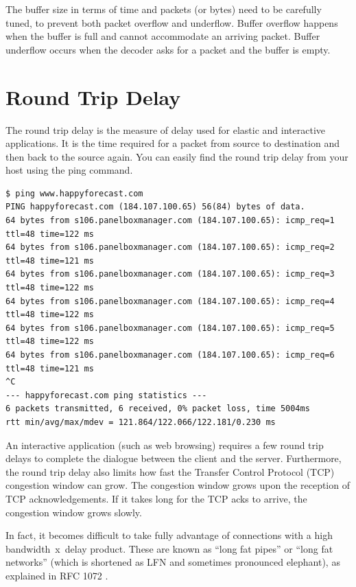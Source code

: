 The buffer size in terms of time and packets (or bytes) need to be carefully tuned, to prevent both packet overflow and underflow.
Buffer overflow happens when the buffer is full and cannot accommodate an arriving packet.
Buffer underflow occurs when the decoder asks for a packet and the buffer is empty.

\section{Round Trip Delay}

The round trip delay is the measure of delay used for elastic and interactive applications.
It is the time required for a packet from source to destination and then back to the source again.
You can easily find the round trip delay from your host using the ping command.

\begin{lstlisting}
$ ping www.happyforecast.com
PING happyforecast.com (184.107.100.65) 56(84) bytes of data.
64 bytes from s106.panelboxmanager.com (184.107.100.65): icmp_req=1 ttl=48 time=122 ms
64 bytes from s106.panelboxmanager.com (184.107.100.65): icmp_req=2 ttl=48 time=121 ms
64 bytes from s106.panelboxmanager.com (184.107.100.65): icmp_req=3 ttl=48 time=122 ms
64 bytes from s106.panelboxmanager.com (184.107.100.65): icmp_req=4 ttl=48 time=122 ms
64 bytes from s106.panelboxmanager.com (184.107.100.65): icmp_req=5 ttl=48 time=122 ms
64 bytes from s106.panelboxmanager.com (184.107.100.65): icmp_req=6 ttl=48 time=121 ms
^C
--- happyforecast.com ping statistics ---
6 packets transmitted, 6 received, 0% packet loss, time 5004ms
rtt min/avg/max/mdev = 121.864/122.066/122.181/0.230 ms
\end{lstlisting}

An interactive application (such as web browsing) requires a few round trip delays to complete the dialogue between the client and the server.
Furthermore, the round trip delay also limits how fast the Transfer Control Protocol (TCP) congestion window can grow.
The congestion window grows upon the reception of TCP acknowledgements.
If it takes long for the TCP acks to arrive, the congestion window grows slowly.

In fact, it becomes difficult to take fully advantage of connections with a high \mbox{bandwidth x delay} product.
These are known as ``long fat pipes'' or ``long fat networks'' (which is shortened as LFN and sometimes pronounced elephant), as explained in RFC 1072 \cite{rfc1072}.

